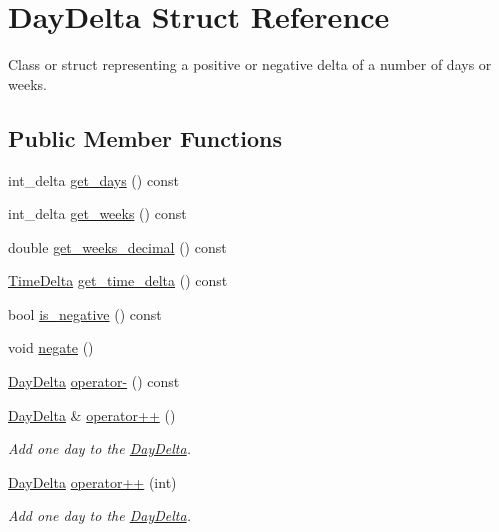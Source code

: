 \hypertarget{structDayDelta}{\section{\-Day\-Delta \-Struct \-Reference}
\label{structDayDelta}
}


\-Class or struct representing a positive or negative delta of a number of days or weeks.  


\subsection*{\-Public \-Member \-Functions}
\begin{DoxyCompactItemize}
\item 
int\-\_\-delta \hyperlink{structDayDelta_a59159b1d56a28b5f2a693979e4b280a1}{get\-\_\-days} () const 
\item 
int\-\_\-delta \hyperlink{structDayDelta_a2f4510044f51ebb61ffef942ee173de2}{get\-\_\-weeks} () const 
\item 
double \hyperlink{structDayDelta_a2e3251e65463940ef87d447d51948e05}{get\-\_\-weeks\-\_\-decimal} () const 
\item 
\hyperlink{structTimeDelta}{\-Time\-Delta} \hyperlink{structDayDelta_ab10777d5c043236aa613081d56317642}{get\-\_\-time\-\_\-delta} () const 
\item 
bool \hyperlink{structDayDelta_a10d6b9eac43322a957f7c3dfbedc2862}{is\-\_\-negative} () const 
\item 
void \hyperlink{structDayDelta_a23b9453556a255f5413aee21b12938a6}{negate} ()
\item 
\hyperlink{structDayDelta}{\-Day\-Delta} \hyperlink{structDayDelta_ab147a13f61362001a4acdaa1b782d1cf}{operator-\/} () const 
\item 
\hyperlink{structDayDelta}{\-Day\-Delta} \& \hyperlink{structDayDelta_aa0a78ca9d3a6a3241211e22d638e0323}{operator++} ()
\begin{DoxyCompactList}\small\item\em \-Add one day to the \hyperlink{structDayDelta}{\-Day\-Delta}. \end{DoxyCompactList}\item 
\hyperlink{structDayDelta}{\-Day\-Delta} \hyperlink{structDayDelta_a6f5ca65ca16018cdf39bd5543cbec127}{operator++} (int)
\begin{DoxyCompactList}\small\item\em \-Add one day to the \hyperlink{structDayDelta}{\-Day\-Delta}. \end{DoxyCompactList}\item 

\end{DoxyCompactItemize}
